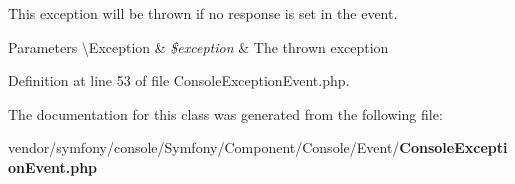 This exception will be thrown if no response is set in the event.


\begin{DoxyParams}[1]{Parameters}
\textbackslash{}\+Exception & {\em \$exception} & The thrown exception \\
\hline
\end{DoxyParams}


Definition at line 53 of file Console\+Exception\+Event.\+php.



The documentation for this class was generated from the following file\+:\begin{DoxyCompactItemize}
\item 
vendor/symfony/console/\+Symfony/\+Component/\+Console/\+Event/{\bf Console\+Exception\+Event.\+php}\end{DoxyCompactItemize}
